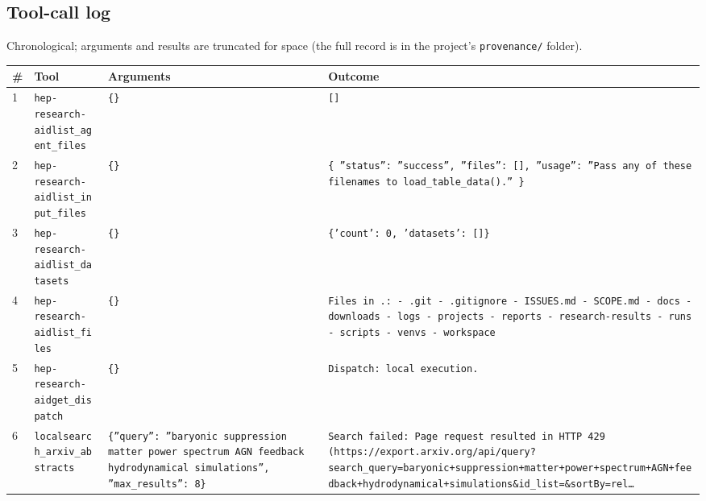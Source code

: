 \documentclass[11pt,a4paper]{article}
\begin{document}
\subsection{Tool-call log}
Chronological; arguments and results are truncated for space (the full record is in the project's \texttt{provenance/} folder).
\begin{longtable}{@{}p{}p{}p{}p{}@{}}
\toprule \# & Tool & Arguments & Outcome \\ \midrule \endhead
1 & \texttt{hep-research-aid}\newline\texttt{list\_\allowbreak{}agent\_\allowbreak{}files} & \texttt{\{\}\allowbreak{}} & \texttt{[]\allowbreak{}} \\
2 & \texttt{hep-research-aid}\newline\texttt{list\_\allowbreak{}input\_\allowbreak{}files} & \texttt{\{\}\allowbreak{}} & \texttt{\{   ''status'':\allowbreak{} ''success'',\allowbreak{}   ''files'':\allowbreak{} []\allowbreak{},\allowbreak{}   ''usage'':\allowbreak{} ''Pass any of these filenames to load\_\allowbreak{}table\_\allowbreak{}data()\allowbreak{}.'' \}\allowbreak{}} \\
3 & \texttt{hep-research-aid}\newline\texttt{list\_\allowbreak{}datasets} & \texttt{\{\}\allowbreak{}} & \texttt{\{'count':\allowbreak{} 0,\allowbreak{} 'datasets':\allowbreak{} []\allowbreak{}\}\allowbreak{}} \\
4 & \texttt{hep-research-aid}\newline\texttt{list\_\allowbreak{}files} & \texttt{\{\}\allowbreak{}} & \texttt{Files in .:\allowbreak{}   - .git   - .gitignore   - ISSUES.md   - SCOPE.md   - docs   - downloads   - logs   - projects   - reports   - research-results   - runs   - scripts   - venvs   - workspace} \\
5 & \texttt{hep-research-aid}\newline\texttt{get\_\allowbreak{}dispatch} & \texttt{\{\}\allowbreak{}} & \texttt{Dispatch:\allowbreak{} local execution.} \\
6 & \texttt{local}\newline\texttt{search\_\allowbreak{}arxiv\_\allowbreak{}abstracts} & \texttt{\{''query'':\allowbreak{} ''baryonic suppression matter power spectrum AGN feedback hydrodynamical simulations'',\allowbreak{} ''max\_\allowbreak{}results'':\allowbreak{} 8\}\allowbreak{}} & \texttt{Search failed:\allowbreak{} Page request resulted in HTTP 429 (https:\allowbreak{}/\allowbreak{}/\allowbreak{}export.arxiv.org/\allowbreak{}api/\allowbreak{}query?search\_\allowbreak{}query=\allowbreak{}baryonic+suppression+matter+power+spectrum+AGN+feedback+hydrodynamical+simulations\&id\_\allowbreak{}list=\allowbreak{}\&sortBy=\allowbreak{}rel\ldots{}\allowbreak{}} \\

\end{longtable}
\end{document}
